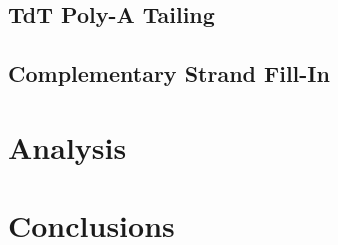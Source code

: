 \documentclass{ssiBio}
\begin{document}
\subsection{TdT Poly-A Tailing}

\subsection{Complementary Strand Fill-In}

\section{Analysis}

\section{Conclusions}



\end{document}
